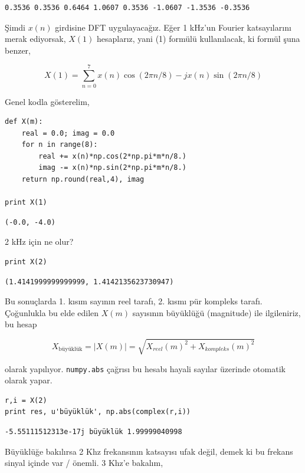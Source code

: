 \documentclass[12pt,fleqn]{article}\usepackage{../../common}
\begin{document}
\begin{verbatim}
0.3536 0.3536 0.6464 1.0607 0.3536 -1.0607 -1.3536 -0.3536
\end{verbatim}

Şimdi $x(n)$ girdisine DFT uygulayacağız. Eğer 1 kHz'un Fourier
katsayılarını merak ediyorsak, $X(1)$ hesaplarız, yani (1) formülü
kullanılacak, ki formül şuna benzer,

$$ X(1) = \sum_{n=0}^{7}  x(n)\cos(2\pi n / 8) - jx(n)\sin(2\pi n / 8) $$

Genel kodla gösterelim,

\begin{verbatim}
def X(m):
    real = 0.0; imag = 0.0
    for n in range(8): 
        real += x(n)*np.cos(2*np.pi*m*n/8.)
        imag -= x(n)*np.sin(2*np.pi*m*n/8.)
    return np.round(real,4), imag

print X(1)
\end{verbatim}

\begin{verbatim}
(-0.0, -4.0)
\end{verbatim}

2 kHz için ne olur?

\begin{verbatim}
print X(2)
\end{verbatim}

\begin{verbatim}
(1.4141999999999999, 1.4142135623730947)
\end{verbatim}

Bu sonuçlarda 1. kısım sayının reel tarafı, 2. kısmı pür kompleks
tarafı. Çoğunlukla bu elde edilen $X(m)$ sayısının büyüklüğü (magnitude) ile
ilgileniriz, bu hesap

$$ X_{\textrm{büyüklük}} = |X(m)| = \sqrt{X_{reel}(m)^2 + X_{kompleks}(m)^2}$$

olarak yapılıyor. \verb!numpy.abs! çağrısı bu hesabı hayali sayılar
üzerinde otomatik olarak yapar.

\begin{verbatim}
r,i = X(2)
print res, u'büyüklük', np.abs(complex(r,i))
\end{verbatim}

\begin{verbatim}
-5.55111512313e-17j büyüklük 1.99999040998
\end{verbatim}

Büyüklüğe bakılırsa 2 Khz frekansının katsayısı ufak değil, demek ki bu
frekans sinyal içinde var / önemli. 3 Khz'e bakalım,
\end{document}
